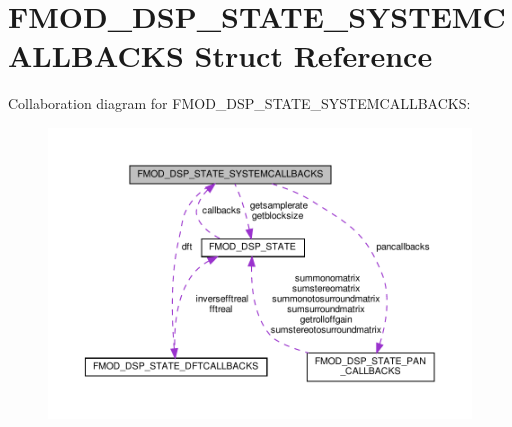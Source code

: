 \hypertarget{structFMOD__DSP__STATE__SYSTEMCALLBACKS}{}\section{F\+M\+O\+D\+\_\+\+D\+S\+P\+\_\+\+S\+T\+A\+T\+E\+\_\+\+S\+Y\+S\+T\+E\+M\+C\+A\+L\+L\+B\+A\+C\+KS Struct Reference}
\label{structFMOD__DSP__STATE__SYSTEMCALLBACKS}


Collaboration diagram for F\+M\+O\+D\+\_\+\+D\+S\+P\+\_\+\+S\+T\+A\+T\+E\+\_\+\+S\+Y\+S\+T\+E\+M\+C\+A\+L\+L\+B\+A\+C\+KS\+:
\nopagebreak
\begin{figure}[H]
\begin{center}
\leavevmode
\includegraphics[width=350pt]{structFMOD__DSP__STATE__SYSTEMCALLBACKS__coll__graph}
\end{center}
\end{figure}
